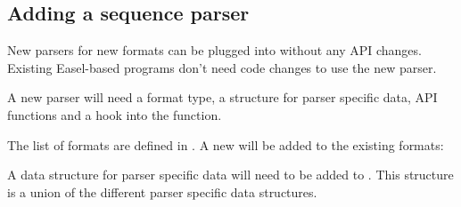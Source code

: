 






\subsection{Adding a sequence parser}

New parsers for new formats can be plugged into  without
any API changes. Existing Easel-based programs don't need code changes
to use the new parser.

A new parser will need a format type, a structure for parser specific
data, API functions and a hook into the  function.

The list of formats are defined in .  A new
 will be added to the existing formats:



A data structure for parser specific data will need to be added
to .  This structure is a union of the 
different parser specific data structures. 

